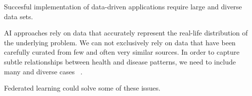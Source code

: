 Succesful implementation of data-driven applications
require large and diverse data sets.

AI approaches rely on data that accurately represent
the real-life distribution of the underlying problem.
We can not exclusively rely on data that have been carefully curated 
from few and often very similar sources. 
In order to capture subtle relationships 
between health and disease patterns,
we need to include many and diverse cases~%
\autocite{riekeFuture2020}.

Federated learning could solve some of these issues\autocite{riekeFuture2020}.

